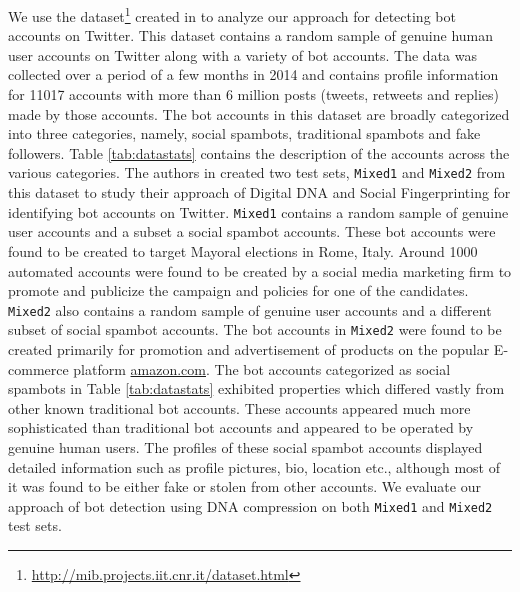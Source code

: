 \documentclass{llncs}
\begin{document}
We use the dataset\footnote{\url{http://mib.projects.iit.cnr.it/dataset.html}} created in \cite{Cresci:2017:PSS:3041021.3055135} to analyze our approach for detecting bot accounts on Twitter. This dataset contains a random sample of genuine human user accounts on Twitter along with a variety of bot accounts. The data was collected over a period of a few months in 2014 and contains profile information for 11017 accounts with more than 6 million posts (tweets, retweets and replies) made by those accounts. The bot accounts in this dataset are broadly categorized into three categories, namely, social spambots, traditional spambots and fake followers. Table \ref{tab:datastats} contains the description of the accounts across the various categories. The authors in \cite{7876716} created two test sets, \texttt{Mixed1} and \texttt{Mixed2} from this dataset to study their approach of Digital DNA and Social Fingerprinting for identifying bot accounts on Twitter. \texttt{Mixed1} contains a random sample of genuine user accounts and a subset a social spambot accounts. These bot accounts were found to be created to target Mayoral elections in Rome, Italy. Around 1000 automated accounts were found to be created by a social media marketing firm to promote and publicize the campaign and policies for one of the candidates. \texttt{Mixed2} also contains a random sample of genuine user accounts and a different subset of social spambot accounts. The bot accounts in \texttt{Mixed2} were found to be created primarily for promotion and advertisement of products on the popular E-commerce platform \url{amazon.com}. The bot accounts categorized as social spambots in Table \ref{tab:datastats} exhibited properties which differed vastly from other known traditional bot accounts. These accounts appeared much more sophisticated than traditional bot accounts and appeared to be operated by genuine human users. The profiles of these social spambot accounts displayed detailed information such as profile pictures, bio, location etc., although most of it was found to be either fake or stolen from other accounts. We evaluate our approach of bot detection using DNA compression on both \texttt{Mixed1} and \texttt{Mixed2} test sets.
\end{document}

